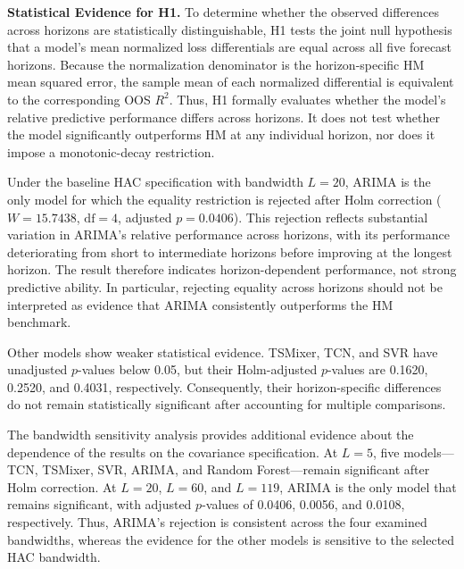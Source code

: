 \documentclass[runningheads,orivec]{llncs}
\begin{document}
\medskip
\noindent\textbf{Statistical Evidence for H1.} To determine whether the observed differences across horizons are statistically distinguishable, H1 tests the joint null hypothesis that a model's mean normalized loss differentials are equal across all five forecast horizons. Because the normalization denominator is the horizon-specific HM mean squared error, the sample mean of each normalized differential is equivalent to the corresponding OOS $R^2$. Thus, H1 formally evaluates whether the model's relative predictive performance differs across horizons. It does not test whether the model significantly outperforms HM at any individual horizon, nor does it impose a monotonic-decay restriction.

Under the baseline HAC specification with bandwidth $L=20$, ARIMA is the only model for which the equality restriction is rejected after Holm correction ($W=15.7438$, $\mathrm{df}=4$, adjusted $p=0.0406$). This rejection reflects substantial variation in ARIMA's relative performance across horizons, with its performance deteriorating from short to intermediate horizons before improving at the longest horizon. The result therefore indicates horizon-dependent performance, not strong predictive ability. In particular, rejecting equality across horizons should not be interpreted as evidence that ARIMA consistently outperforms the HM benchmark.

Other models show weaker statistical evidence. TSMixer, TCN, and SVR have unadjusted $p$-values below 0.05, but their Holm-adjusted $p$-values are 0.1620, 0.2520, and 0.4031, respectively. Consequently, their horizon-specific differences do not remain statistically significant after accounting for multiple comparisons.

The bandwidth sensitivity analysis provides additional evidence about the dependence of the results on the covariance specification. At $L=5$, five models---TCN, TSMixer, SVR, ARIMA, and Random Forest---remain significant after Holm correction. At $L=20$, $L=60$, and $L=119$, ARIMA is the only model that remains significant, with adjusted $p$-values of 0.0406, 0.0056, and 0.0108, respectively. Thus, ARIMA's rejection is consistent across the four examined bandwidths, whereas the evidence for the other models is sensitive to the selected HAC bandwidth.
\end{document}
